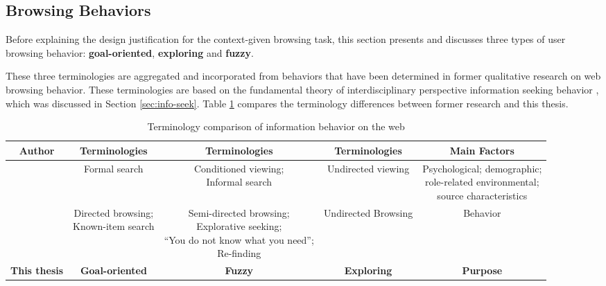 \subsection{Browsing Behaviors}
\label{sec:behavior}

Before explaining the design justification for the context-given browsing task, 
this section presents and discusses three types of user browsing behavior: 
\textbf{goal-oriented}, \textbf{exploring} and \textbf{fuzzy}.

These three terminologies are aggregated and incorporated from behaviors that 
have been determined in former qualitative research on web browsing behavior.
These terminologies are based on the fundamental theory of 
interdisciplinary perspective information seeking behavior \cite{wilson1997information},
which was discussed in Section \ref{sec:info-seek}.
Table \ref{table:info-seek} compares the terminology differences between former research 
and this thesis.

\begin{table}[H]
    \small
    \centering
    \caption{Terminology comparison of information behavior on the web}
    \begin{adjustbox}{width=\textwidth}
        \begin{tabular}{ccccc}
            \toprule
            \textbf{Author} & \textbf{Terminologies} & \textbf{Terminologies} & \textbf{Terminologies} & \textbf{Main Factors} \\
            \hline
            \cite{choo1999information} & Formal search & \makecell{Conditioned viewing; \\ Informal search} & Undirected viewing & \makecell{Psychological; demographic;\\ role-related environmental; \\source characteristics} \\
            \cite{johnson2017patterns} & \makecell{Directed browsing; \\Known-item search} & \makecell{Semi-directed browsing; \\Explorative seeking; \\``You do not know what you need''; \\Re-finding} & Undirected Browsing & Behavior \\
            \textbf{This thesis} & \textbf{Goal-oriented} & \textbf{Fuzzy} & \textbf{Exploring} & \textbf{Purpose} \\
            \bottomrule
        \end{tabular}
        \label{table:info-seek}
    \end{adjustbox}
\end{table}

